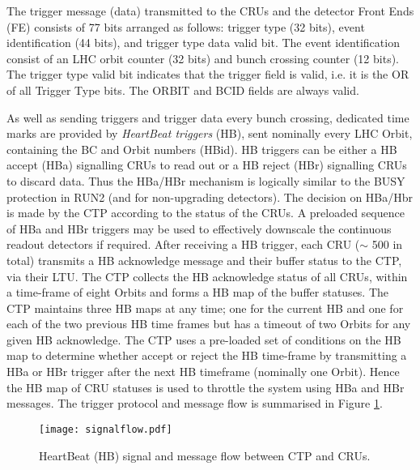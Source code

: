 The trigger message (data) transmitted to the CRUs and the detector Front Ends (FE) consists of 77 bits arranged as follows: trigger type (32 bits), event identification (44 bits), and trigger type data valid bit. The event identification consist of an LHC orbit counter (32 bits) and bunch crossing counter (12 bits).
The trigger type valid bit indicates that the trigger field is valid, i.e. it is the OR of all Trigger Type bits. 
The ORBIT and BCID fields are always valid. 

As well as sending triggers and trigger data every bunch crossing, dedicated time marks are provided by {\it HeartBeat triggers} (HB), sent nominally every LHC Orbit, containing the BC and Orbit numbers (HBid). HB triggers can be either a  HB accept (HBa) signalling CRUs to read out or a HB reject (HBr) signalling CRUs to discard data. Thus the HBa/HBr mechanism is logically similar to the BUSY protection in RUN2 (and for non-upgrading detectors). The decision on HBa/Hbr is made by the CTP according to the status of the CRUs.
A preloaded sequence of HBa and HBr triggers may be used to effectively downscale the continuous readout detectors if required. After receiving a HB trigger, each CRU ($\sim$ 500 in total) transmits a HB acknowledge message and their buffer status to the CTP, via their LTU. The CTP collects the HB acknowledge status of all CRUs, within a time-frame of eight Orbits and forms a HB map of the buffer statuses. The CTP maintains three HB maps at any time; one for the current HB and one for each of the two previous HB time frames but has a timeout of two Orbits for any given HB acknowledge. The CTP uses a pre-loaded set of conditions on the HB map to determine whether accept or reject the HB time-frame by transmitting a HBa or HBr trigger after the next HB timeframe (nominally one Orbit). Hence the HB map of CRU statuses is used to throttle the system using HBa and HBr messages. The trigger protocol and message flow is summarised in Figure \ref{fig:sigflow}.
\begin{figure}[h]
\centering
%
\texttt{[image: signalflow.pdf]}
\caption{\label{fig:sigflow} HeartBeat (HB) signal and message flow between CTP and CRUs. }
\end{figure}

